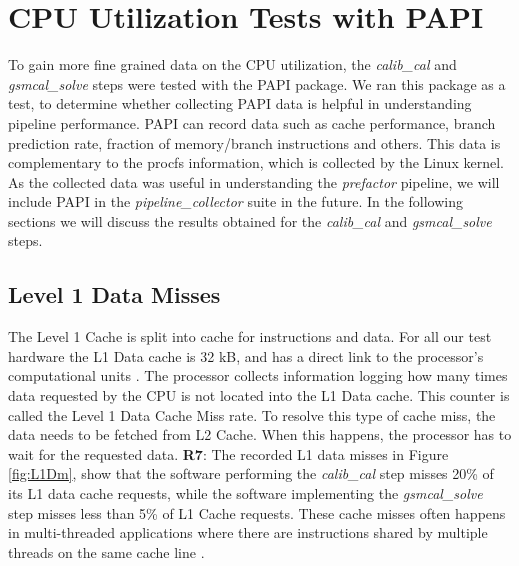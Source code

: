 \section{CPU Utilization Tests with PAPI}\label{sec:PAPI}

To gain more fine grained data on the CPU utilization, the \textit{calib\_cal} and \textit{gsmcal\_solve} steps were tested with the PAPI package.  We ran this package as a test, to determine whether collecting PAPI data is helpful in understanding pipeline performance.  PAPI can record data such as cache performance, branch prediction rate, fraction of memory/branch instructions and others. This data is complementary to the procfs information, which is collected by the Linux kernel. As the collected data was useful in understanding the \textit{prefactor} pipeline, we will include PAPI in the \textit{pipeline\_collector} suite in the future. In the following sections we will discuss the results obtained for the \textit{calib\_cal} and \textit{gsmcal\_solve} steps.

\subsection{Level 1 Data Misses}

The Level 1 Cache is split into cache for instructions and data. For all our test hardware the L1 Data cache is 32 kB, and has a direct link to the processor's computational units \citep{haswell}. The processor collects information logging how many times data requested by the CPU is not located into the L1 Data cache. This counter is called the Level 1 Data Cache Miss rate. To resolve this type of cache miss, the data needs to be fetched from L2 Cache. When this happens, the processor has to wait for the requested data. \textbf{R7}: The recorded L1 data misses in Figure \ref{fig:L1Dm}, show that the software performing the \textit{calib\_cal} step  misses 20\% of its L1 data cache requests, while the software implementing the \textit{gsmcal\_solve} step misses less than 5\% of L1 Cache requests. These cache misses often happens in multi-threaded applications where there are instructions shared by multiple threads on the same cache line \citep{cache_opt}. 

